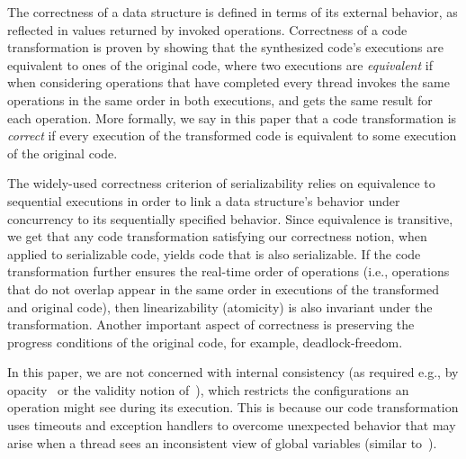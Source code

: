 The correctness of a data structure is defined in terms of its external behavior, as reflected in values returned by invoked operations.
Correctness of a code transformation is proven by showing that the synthesized code's executions are equivalent to ones of the original code,
where two executions are  \emph{equivalent} if when considering operations that have completed every thread invokes the same
operations in the same order  in both executions, and gets the same result for each operation. More formally, we say in this paper that a code transformation is \emph{correct} if every execution of the transformed code
is equivalent to some execution of the original code.

The widely-used correctness criterion of serializability relies on equivalence to sequential executions in order to
link a data structure's behavior under concurrency to its sequentially specified behavior. Since equivalence is transitive,
we get that any code transformation satisfying our correctness notion, when applied to serializable code, yields code that is also serializable.
If the code transformation further ensures the real-time order of operations (i.e., operations that do not overlap appear in the same order in 
executions of the transformed and original code), then linearizability (atomicity) is also invariant under the transformation.
Another important aspect of correctness is preserving the progress conditions of the original code, for example, deadlock-freedom.

In this paper, we are not concerned with internal consistency (as required e.g., by opacity~\cite{GuerraouiK2008} or the validity notion of~\cite{LevAriCK2014}),
which restricts the configurations an operation might see during its execution.
This is because our code transformation uses timeouts and exception handlers to overcome unexpected behavior that may arise when a thread sees an inconsistent view of global variables (similar to~\cite{Nakaike:2010}).


